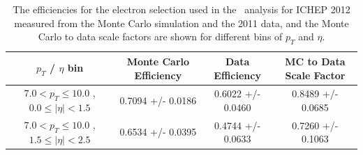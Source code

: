 \documentclass{cmspaper}
\begin{document}
 \begin{table}[!ht]
 \begin{center} 
 \begin{tabular}{|c|c|c|c|}
 \hline
 $p_{T}$ / $\eta$ bin    &  Monte Carlo Efficiency    &  Data Efficiency   &  MC to Data Scale Factor \\   \hline           
$  7.0 < p_{T} \le  10.0$ , $  0.0  \le |\eta| <   1.5$   &       0.7094 +/- 0.0186   &       0.6022 +/- 0.0460   &       0.8489 +/- 0.0685   \\   
\hline
$  7.0 < p_{T} \le  10.0$ , $  1.5  \le |\eta| <   2.5$   &       0.6534 +/- 0.0395   &       0.4744 +/- 0.0633   &       0.7260 +/- 0.1063   \\   
\hline
\end{tabular}
\caption{The efficiencies for the electron selection used in the \HiggsToZZ\ analysis for ICHEP 2012
measured from the Monte Carlo simulation and the 2011 data, and the Monte Carlo
to data scale factors are shown for different bins of $p_{T}$ and $\eta$. }
\label{tab:Efficiency_HZZICHEP2012WP_Data2011}
\end{center}
\end{table}
\end{document}
